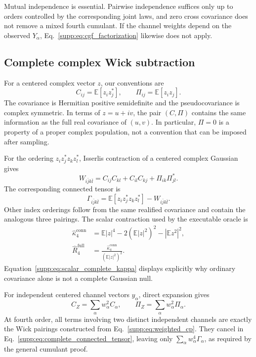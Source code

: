 Mutual independence is essential.  Pairwise independence suffices only up to
orders controlled by the corresponding joint laws, and zero cross covariance
does not remove a mixed fourth cumulant.  If the channel weights depend on
the observed $Y_\alpha$, Eq.~\eqref{supp:eq:cgf_factorization} likewise does
not apply.

\subsection{Complete complex Wick subtraction}

For a centered complex vector $z$, our conventions are
\begin{equation}
 C_{ij}=\mathbb E[z_i z_j^*],
 \qquad
 \Pi_{ij}=\mathbb E[z_i z_j].
 \label{supp:eq:complex_second_moments}
\end{equation}
The covariance is Hermitian positive semidefinite and the pseudocovariance is
complex symmetric.  In terms of $z=u+iv$, the pair $(C,\Pi)$ contains the
same information as the full real covariance of $(u,v)$.  In particular,
$\Pi=0$ is a property of a proper complex population, not a convention that
can be imposed after sampling.

For the ordering $z_i z_j^*z_k z_l^*$, Isserlis contraction of a centered
complex Gaussian gives
\begin{equation}
 W_{i\bar j k\bar l}
 =C_{ij}C_{kl}+C_{il}C_{kj}+\Pi_{ik}\Pi_{jl}^*.
 \label{supp:eq:complex_wick_tensor}
\end{equation}
The corresponding connected tensor is
\begin{equation}
 \Gamma_{i\bar j k\bar l}
 =\mathbb E[z_i z_j^*z_k z_l^*]
 -W_{i\bar j k\bar l}.
 \label{supp:eq:complete_connected_tensor}
\end{equation}
Other index orderings follow from the same realified covariance and contain
the analogous three pairings.  The scalar contraction used by the executable
oracle is
\begin{align}
 \widehat\kappa_4^{\mathrm{conn}}
 &=\mathbb E|z|^4
 -2(\mathbb E|z|^2)^2
 -|\mathbb E z^2|^2,\nonumber\\
 \widehat R_4^{\mathrm{full}}
 &=\frac{\widehat\kappa_4^{\mathrm{conn}}}
 {(\mathbb E|z|^2)^2} .
 \label{supp:eq:scalar_complete_kappa}
\end{align}
Equation~\eqref{supp:eq:scalar_complete_kappa} displays explicitly why
ordinary covariance alone is not a complete Gaussian null.

For independent centered channel vectors $y_\alpha$, direct expansion gives
\begin{equation}
 C_Z=\sum_\alpha w_\alpha^2 C_\alpha,
 \qquad
 \Pi_Z=\sum_\alpha w_\alpha^2\Pi_\alpha.
 \label{supp:eq:weighted_cp}
\end{equation}
At fourth order, all terms involving two distinct independent channels are
exactly the Wick pairings constructed from Eq.~\eqref{supp:eq:weighted_cp}.
They cancel in Eq.~\eqref{supp:eq:complete_connected_tensor}, leaving only
$\sum_\alpha w_\alpha^4\Gamma_\alpha$, as required by the general cumulant
proof.

